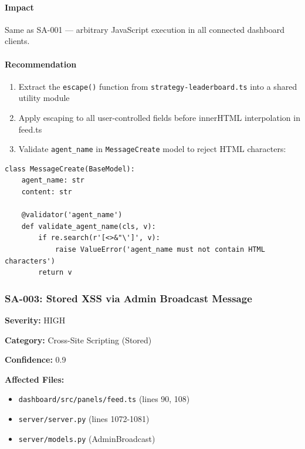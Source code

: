 \documentclass[twocolumn,10pt,letterpaper]{article}
\begin{document}
\paragraph{Impact}

Same as SA-001 — arbitrary JavaScript execution in all connected dashboard clients.


\paragraph{Recommendation}

\begin{enumerate}
\setlength{\itemsep}{0pt}
\setlength{\parskip}{0pt}
  \item Extract the \texttt{escape()} function from \texttt{strategy-\allowbreak leaderboard.ts} into a shared utility module
  \item Apply escaping to all user-controlled fields before innerHTML interpolation in feed.ts
  \item Validate \texttt{agent\_name} in \texttt{MessageCreate} model to reject HTML characters:
\end{enumerate}

\begin{lstlisting}
class MessageCreate(BaseModel):
    agent_name: str
    content: str

    @validator('agent_name')
    def validate_agent_name(cls, v):
        if re.search(r'[<>&"\']', v):
            raise ValueError('agent_name must not contain HTML characters')
        return v
\end{lstlisting}

\subsubsection{SA-003: Stored XSS via Admin Broadcast Message}

\textbf{Severity:} HIGH  

\textbf{Category:} Cross-Site Scripting (Stored)  

\textbf{Confidence:} 0.9  

\textbf{Affected Files:}  


\begin{itemize}
\setlength{\itemsep}{0pt}
\setlength{\parskip}{0pt}
  \item \texttt{dashboard/\allowbreak src/\allowbreak panels/\allowbreak feed.ts} (lines 90, 108)
  \item \texttt{server/\allowbreak server.py} (lines 1072-1081)
  \item \texttt{server/\allowbreak models.py} (AdminBroadcast)
\end{itemize}
\end{document}
